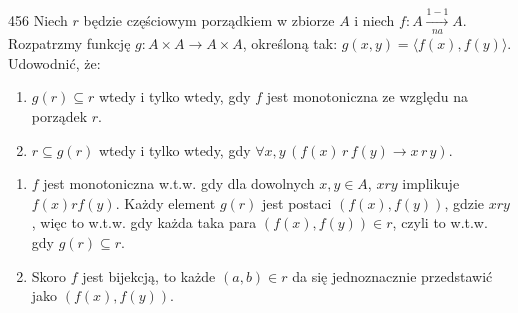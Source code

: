 \documentclass{../note}
\begin{document}
\begin{zadanie}{456}
Niech $r$ będzie częściowym porządkiem w zbiorze $A$ i niech $f: A \xrightarrow[na]{1-1} A$. Rozpatrzmy funkcję $g: A \times A \to A \times A$, określoną tak: $g(x,y) = \langle f(x), f(y) \rangle$. Udowodnić, że:
\begin{enumerate}[label=(\alph*)]
    \item $g(r) \subseteq r$ wtedy i tylko wtedy, gdy $f$ jest monotoniczna ze względu na porządek $r$.
    \item $r \subseteq g(r)$ wtedy i tylko wtedy, gdy $\forall x,y \, (f(x) \, r \, f(y) \to x \, r \, y)$.
\end{enumerate}
\end{zadanie}
\begin{rozwiazanie}
\begin{enumerate}[label=(\alph*)]
    \item $f$ jest monotoniczna w.t.w. gdy dla dowolnych $x, y \in A$, $x r y$ implikuje $f(x) r f(y)$. Każdy element $g(r)$ jest postaci $(f(x), f(y))$, gdzie $xry$, więc to w.t.w. gdy każda taka para $(f(x), f(y)) \in r$, czyli to w.t.w. gdy $g(r) \subseteq r$.
    \item Skoro $f$ jest bijekcją, to każde $(a, b) \in r$ da się jednoznacznie przedstawić jako $(f(x), f(y))$.
\end{enumerate}
\end{rozwiazanie}
\end{document}
